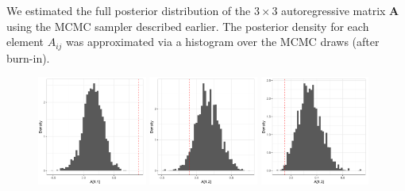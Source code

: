 
We estimated the full posterior distribution of the $3 \times 3$ autoregressive matrix $\mathbf{A}$ using the MCMC sampler described earlier. The posterior density for each element $A_{ij}$ was approximated via a histogram over the MCMC draws (after burn-in).

\begin{figure}[h!]
    \centering
    \includegraphics[width=0.32\textwidth]{../figures/post_A11.png}
    \includegraphics[width=0.32\textwidth]{../figures/post_A12.png}
    \includegraphics[width=0.32\textwidth]{../figures/post_A13.png}
    

\end{figure}
